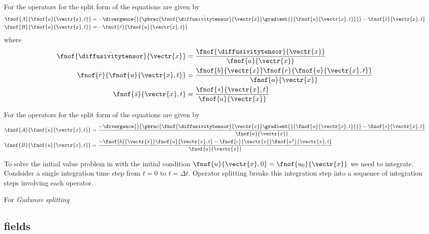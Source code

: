 For  the operators for the split form of the equations are given by
\begin{align}
  \fnof{A}{\fnof{u}{\vectr{x},t}}&=-\divergence{}{\pbrac{\fnof{\bar{\diffusivitytensor}}{\vectr{x}}
      \gradient{}{\fnof{u}{\vectr{x},t}}}}-\fnof{\bar{s}}{\vectr{x},t}
  \label{eqn:GeneralisedReactionDiffusionSplitEquationA} \\
  \fnof{B}{\fnof{u}{\vectr{x},t}}&=-\fnof{\bar{r}}{\fnof{u}{\vectr{x},t}}
  \label{eqn:GeneralisedReactionDiffusionSplitEquationB}
\end{align}
where
\begin{align}
  \fnof{\bar{\diffusivitytensor}}{\vectr{x}}&=\dfrac{\fnof{\diffusivitytensor}{\vectr{x}}}{\fnof{a}{\vectr{x}}} \\
  \fnof{\bar{r}}{\fnof{u}{\vectr{x},t}}&=\dfrac{\fnof{b}{\vectr{x}}\fnof{r}{\fnof{u}{\vectr{x},t}}}{\fnof{a}{\vectr{x}}} \\
  \fnof{\bar{s}}{\vectr{x},t}&=\dfrac{\fnof{s}{\vectr{x},t}}{\fnof{a}{\vectr{x}}}
\end{align}

For  the operators for the split form of the equations are given by
\begin{align}
  \fnof{A}{\fnof{u}{\vectr{x},t}}&=\dfrac{-\divergence{}{\pbrac{\fnof{\diffusivitytensor}{\vectr{x}}
        \gradient{}{\fnof{u}{\vectr{x},t}}}}-\fnof{s}{\vectr{x},t}}{\fnof{a}{\vectr{x}}}
  \label{eqn:GeneralisedFishersSplitEquationA} \\
  \fnof{B}{\fnof{u}{\vectr{x},t}}&=\dfrac{-\fnof{b}{\vectr{x}}\fnof{u}{\vectr{x},t}-
    \fnof{c}{\vectr{x}}\fnof{u^{2}}{\vectr{x},t}}{\fnof{a}{\vectr{x}}}
  \label{eqn:GeneralisedFishersSplitEquationB}
\end{align}

To solve the initial value problem in
 with the initial condition
$\fnof{u}{\vectr{x},0}=\fnof{u_{0}}{\vectr{x}}$ we need to
integrate. Condsider a single integration time step \ie from $t=0$ to
$t=\Delta t$. Operator splitting breaks this integration step into a
sequence of integration steps involving each operator.

For \emph{Gudunov splitting} 

\subsection{\OpenCMISS fields}
\label{subsec:ReactionDiffusionOpenCMISSFields}

